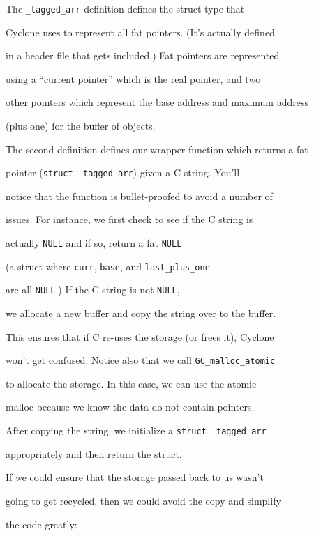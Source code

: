 The \texttt{\_tagged\_arr} definition defines the struct type that


Cyclone uses to represent all fat pointers.  (It's actually defined


in a header file that gets included.)  Fat pointers are represented


using a ``current pointer'' which is the real pointer, and two


other pointers which represent the base address and maximum address


(plus one) for the buffer of objects.  





The second definition defines our wrapper function which returns a fat


pointer (\texttt{struct \_tagged\_arr}) given a C string.  You'll


notice that the function is bullet-proofed to avoid a number of


issues.  For instance, we first check to see if the C string is


actually \texttt{NULL} and if so, return a fat \texttt{NULL} 


(a struct where \texttt{curr}, \texttt{base}, and \texttt{last\_plus\_one}


are all \texttt{NULL}.)  If the C string is not \texttt{NULL},


we allocate a new buffer and copy the string over to the buffer.


This ensures that if C re-uses the storage (or frees it), Cyclone


won't get confused.  Notice also that we call \texttt{GC\_malloc\_atomic}


to allocate the storage.  In this case, we can use the atomic


malloc because we know the data do not contain pointers.


After copying the string, we initialize a \texttt{struct \_tagged\_arr}


appropriately and then return the struct.  





If we could ensure that the storage passed back to us wasn't


going to get recycled, then we could avoid the copy and simplify


the code greatly:


